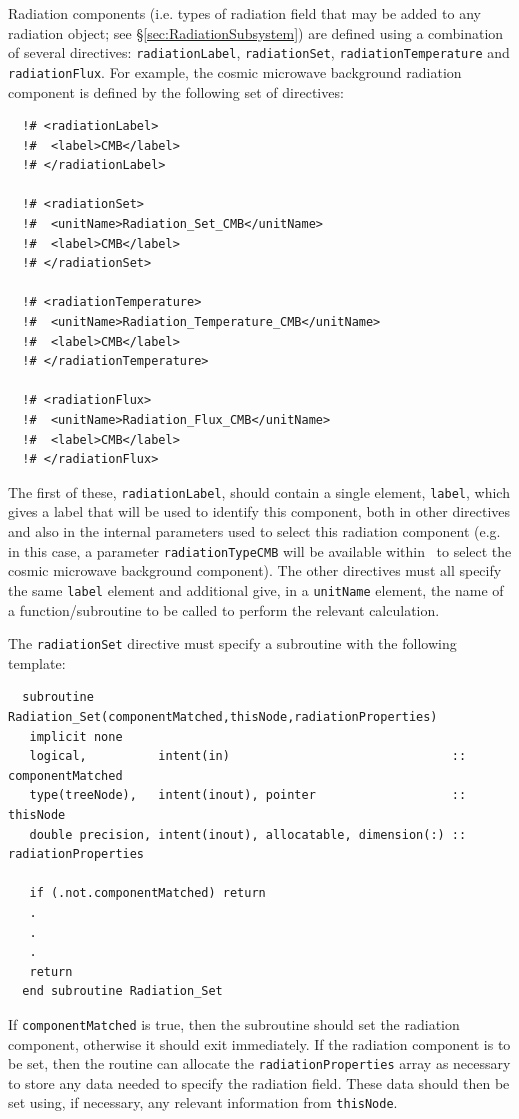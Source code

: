 Radiation components (i.e. types of radiation field that may be added to any radiation object; see \S\ref{sec:RadiationSubsystem}) are defined using a combination of several directives: {\tt radiationLabel}, {\tt radiationSet}, {\tt radiationTemperature} and {\tt radiationFlux}. For example, the cosmic microwave background radiation component is defined by the following set of directives:
\begin{verbatim}
  !# <radiationLabel>
  !#  <label>CMB</label>
  !# </radiationLabel>

  !# <radiationSet>
  !#  <unitName>Radiation_Set_CMB</unitName>
  !#  <label>CMB</label>
  !# </radiationSet>

  !# <radiationTemperature>
  !#  <unitName>Radiation_Temperature_CMB</unitName>
  !#  <label>CMB</label>
  !# </radiationTemperature>

  !# <radiationFlux>
  !#  <unitName>Radiation_Flux_CMB</unitName>
  !#  <label>CMB</label>
  !# </radiationFlux>
\end{verbatim}
The first of these, {\tt radiationLabel}, should contain a single element, {\tt label}, which gives a label that will be used to identify this component, both in other directives and also in the internal parameters used to select this radiation component (e.g. in this case, a parameter {\tt radiationTypeCMB} will be available within \glc\ to select the cosmic microwave background component). The other directives must all specify the same {\tt label} element and additional give, in a {\tt unitName} element, the name of a function/subroutine to be called to perform the relevant calculation.

The {\tt radiationSet} directive must specify a subroutine with the following template:
\begin{verbatim}
  subroutine Radiation_Set(componentMatched,thisNode,radiationProperties)
   implicit none
   logical,          intent(in)                               :: componentMatched
   type(treeNode),   intent(inout), pointer                   :: thisNode
   double precision, intent(inout), allocatable, dimension(:) :: radiationProperties

   if (.not.componentMatched) return
   .
   .
   .
   return
  end subroutine Radiation_Set
\end{verbatim}
If {\tt componentMatched} is true, then the subroutine should set the radiation component, otherwise it should exit immediately. If the radiation component is to be set, then the routine can allocate the {\tt radiationProperties} array as necessary to store any data needed to specify the radiation field. These data should then be set using, if necessary, any relevant information from {\tt thisNode}.

